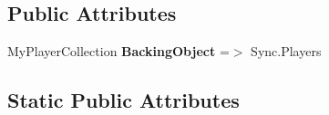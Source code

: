 \subsection*{Public Attributes}
\begin{DoxyCompactItemize}
\item 
\hypertarget{class_s_e_mod_a_p_i_internal_1_1_a_p_i_1_1_common_1_1_player_map_abc9a511544061db96ed522df82f0294d}{}My\+Player\+Collection {\bfseries Backing\+Object} =$>$ Sync.\+Players\label{class_s_e_mod_a_p_i_internal_1_1_a_p_i_1_1_common_1_1_player_map_abc9a511544061db96ed522df82f0294d}

\end{DoxyCompactItemize}
\subsection*{Static Public Attributes}
